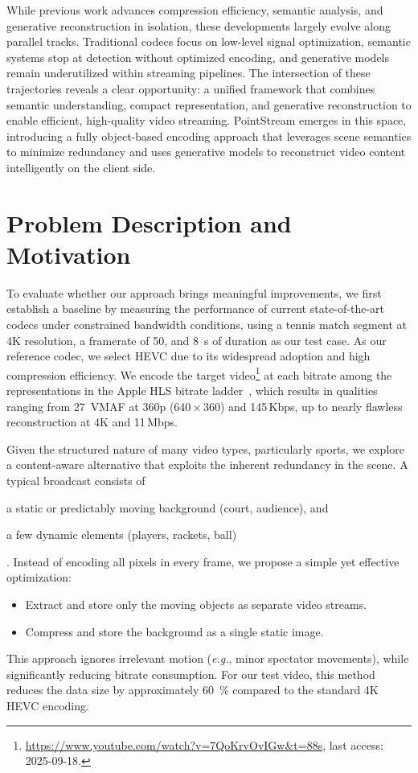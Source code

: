 \documentclass[manuscript, screen]{acmart}
\newcommand{\eg}{\emph{e.g.}, }
\newcommand{\vxv}[2]{$#1\!\times\!#2$}
\begin{document}
While previous work advances compression efficiency, semantic analysis, and generative reconstruction in isolation, these developments largely evolve along parallel tracks. Traditional codecs focus on low-level signal optimization, semantic systems stop at detection without optimized encoding, and generative models remain underutilized within streaming pipelines. The intersection of these trajectories reveals a clear opportunity: a unified framework that combines semantic understanding, compact representation, and generative reconstruction to enable efficient, high-quality video streaming. PointStream emerges in this space, introducing a fully object-based encoding approach that leverages scene semantics to minimize redundancy and uses generative models to reconstruct video content intelligently on the client side.

\section{Problem Description and Motivation}
To evaluate whether our approach brings meaningful improvements, we first establish a baseline by measuring the performance of current state-of-the-art codecs under constrained bandwidth conditions, using a tennis match segment at 4K resolution, a framerate of \SI{50}{\fps}, and \SI{8}{\second} of duration as our test case.
As our reference codec, we select HEVC due to its widespread adoption and high compression efficiency. 
We encode the target video\footnote{\url{https://www.youtube.com/watch?v=7QoKrvOvIGw&t=88s}, last access: 2025-09-18.} at each bitrate among the representations in the Apple HLS bitrate ladder~\cite{AppleHLS}, which results in qualities ranging from \SI{27}{VMAF} at 360p (\vxv{640}{360}) and 145\,Kbps, up to nearly flawless reconstruction at 4K and 11\,Mbps. 

Given the structured nature of many video types, particularly sports, we explore a content-aware alternative that exploits the inherent redundancy in the scene. 
A typical broadcast consists of 
\begin{enumerate*}[label=\textit{(\roman*)}] 
\item a static or predictably moving background (court, audience), and 
\item a few dynamic elements (players, rackets, ball)
\end{enumerate*}.
Instead of encoding all pixels in every frame, we propose a simple yet effective optimization:
\begin{itemize}[topsep=0pt,itemsep=0pt,leftmargin=*]
    \item Extract and store only the moving objects as separate video streams.
    \item Compress and store the background as a single static image.
\end{itemize}
This approach ignores irrelevant motion (\eg minor spectator movements), while significantly reducing bitrate consumption. For our test video, this method reduces the data size by approximately \qty{60}{\percent} compared to the standard 4K HEVC encoding.
\end{document}
